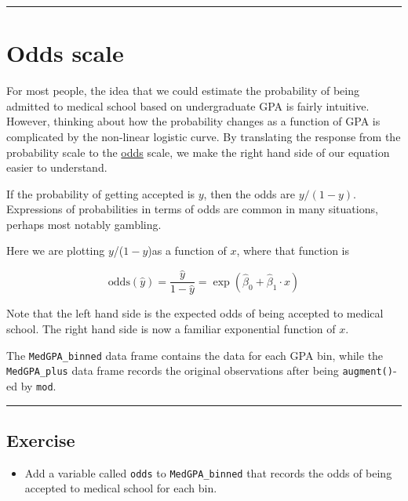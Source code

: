 \documentclass[
]{book}
\providecommand{\tightlist}{%
  \setlength{\itemsep}{0pt}\setlength{\parskip}{0pt}}
\begin{document}
\begin{center}\rule{0.5\linewidth}{0.5pt}\end{center}

\hypertarget{odds-scale}{%
\section{Odds scale}\label{odds-scale}}

For most people, the idea that we could estimate the probability of being admitted to medical school based on undergraduate GPA is fairly intuitive. However, thinking about how the probability changes as a function of GPA is complicated by the non-linear logistic curve. By translating the response from the probability scale to the \href{https://en.wikipedia.org/wiki/Odds}{odds} scale, we make the right hand side of our equation easier to understand.

If the probability of getting accepted is \(y\), then the odds are \(y/(1-y)\). Expressions of probabilities in terms of odds are common in many situations, perhaps most notably gambling.

Here we are plotting \(y\)/(\(1-y\))as a function of \(x\), where that function is

\begin{equation}
\text{odds}(\hat{y})=\frac{\hat{y}}{1 - \hat{y}}=\exp(\hat{\beta}_0 + \hat{\beta}_1 \cdot x)
\end{equation}

Note that the left hand side is the expected odds of being accepted to medical school. The right hand side is now a familiar exponential function of \(x\).

The \texttt{MedGPA\_binned} data frame contains the data for each GPA bin, while the \texttt{MedGPA\_plus} data frame records the original observations after being \texttt{augment()}-ed by \texttt{mod}.

\begin{center}\rule{0.5\linewidth}{0.5pt}\end{center}

\hypertarget{exercise-17}{%
\subsection*{Exercise}\label{exercise-17}}

\begin{itemize}
\tightlist
\item
  Add a variable called \texttt{odds} to \texttt{MedGPA\_binned} that records the odds of being accepted to medical school for each bin.
\end{itemize}
\end{document}
